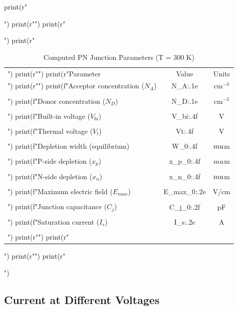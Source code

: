 \documentclass[a4paper, 11pt]{article}
\begin{document}
\begin{pycode}
print(r"\begin{table}[htbp]")
print(r"\centering")
print(r"\caption{Computed PN Junction Parameters (T = 300 K)}")
print(r"\begin{tabular}{lcc}")
print(r"\toprule")
print(r"Parameter & Value & Units \\")
print(r"\midrule")
print(f"Acceptor concentration ($N_A$) & {N_A:.1e} & cm$^{{-3}}$ \\\\")
print(f"Donor concentration ($N_D$) & {N_D:.1e} & cm$^{{-3}}$ \\\\")
print(f"Built-in voltage ($V_{{bi}}$) & {V_bi:.4f} & V \\\\")
print(f"Thermal voltage ($V_t$) & {Vt:.4f} & V \\\\")
print(f"Depletion width (equilibrium) & {W_0:.4f} & $\\mu$m \\\\")
print(f"P-side depletion ($x_p$) & {x_p_0:.4f} & $\\mu$m \\\\")
print(f"N-side depletion ($x_n$) & {x_n_0:.4f} & $\\mu$m \\\\")
print(f"Maximum electric field ($E_{{max}}$) & {E_max_0:.2e} & V/cm \\\\")
print(f"Junction capacitance ($C_j$) & {C_j_0:.2f} & pF \\\\")
print(f"Saturation current ($I_s$) & {I_s:.2e} & A \\\\")
print(r"\bottomrule")
print(r"\end{tabular}")
print(r"\label{tab:parameters}")
print(r"\end{table}")
\end{pycode}

\subsection{Current at Different Voltages}
\end{document}
